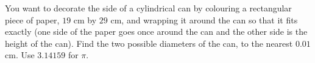 You want to decorate the side of a cylindrical can by colouring a rectangular piece of paper, $19$ cm by $29$ cm, and wrapping it around the can so that it fits exactly (one side of the paper goes once around the can and the other side is the height of the can). Find the two possible diameters of the can, to the nearest $0.01$ cm. Use $3.14159$ for $\pi$.
